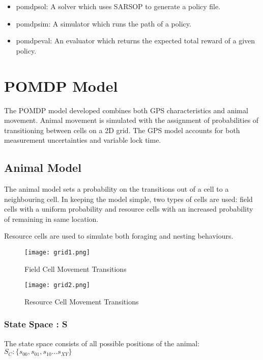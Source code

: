 \documentclass[12pt,openany,a4paper]{book}
\begin{document}
\begin{itemize}
\item {pomdpsol: A solver which uses SARSOP to generate a policy file.}
\item {pomdpsim: A simulator which runs the path of a policy.}
\item {pomdpeval: An evaluator which returns the expected total reward of a given policy.}
\end{itemize}

\chapter{POMDP Model }
The POMDP model developed combines both GPS characteristics and animal movement.
Animal movement is simulated with the assignment of probabilities of transitioning between cells on a 2D grid. The GPS model accounts for both measurement uncertainties and variable lock time.

\section{Animal Model}
The animal model sets a probability on the transitions out of a cell to a neighbouring cell. In keeping the model simple, two types of cells are used: field cells with a uniform probability and resource cells with an increased probability of remaining in same location.

Resource cells are used to simulate both foraging and nesting behaviours.

\begin{figure} [htbp]
\begin{center}
\caption{Field Cell Movement Transitions}
\texttt{[image: grid1.png]}
\end{center}
\end{figure}

\begin{figure} [htbp]
\begin{center}
\caption{Resource Cell Movement Transitions}
\texttt{[image: grid2.png]}
\end{center}
\end{figure}
\subsection*{State Space : S}
The state space consists of all possible positions of the animal: \\
\ensuremath{ S_{C} :\{s_{00}, s_{01}, s_{10} ... s_{XY}\} }
\end{document}
